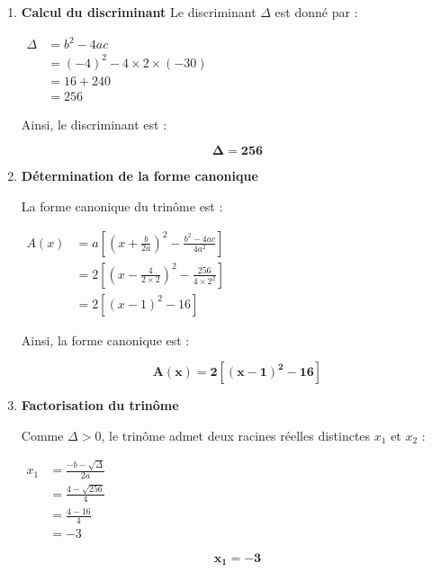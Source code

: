\documentclass[a4paper,12pt]{article}
\begin{document}
\begin{enumerate}
    \item \textbf{Calcul du discriminant}  
    Le discriminant \(\Delta\) est donné par :
    
$
\begin{aligned}
 \Delta &= b^2 - 4ac\\ 
 &= (-4)^2 - 4 \times 2 \times (-30) \\
 &= 16 + 240\\
 &= 256
\end{aligned}
$

Ainsi, le discriminant est : 

\begin{resultbox}
    \[
    \mathbf{\Delta = 256}
    \]
\end{resultbox}

    \item \textbf{Détermination de la forme canonique}  
    
    La forme canonique du trinôme est :

$
\begin{aligned}
    A(x)&= a \left[ \left(x + \frac{b}{2a}\right)^2 - \frac{b^{2}-4ac}{4a^{2}}\right]\\
        &=  2 \left[ \left(x - \frac{4}{2 \times 2 }\right)^2 - \frac{256}{4 \times 2^2}\right]\\
        &=2 \left[\left( x - 1 \right)^2 - 16\right]
\end{aligned}
$

Ainsi, la forme canonique est :

\begin{resultbox}
    \[
    \mathbf{A(x) = 2 \left[\left( x - 1 \right)^2 - 16\right]}
    \]
\end{resultbox}

    \item \textbf{Factorisation du trinôme}  
    
    Comme \(\Delta > 0\), le trinôme admet deux racines réelles distinctes \( x_1 \) et \( x_2 \) :
    
$
\begin{aligned}
        x_1 &= \frac{-b - \sqrt{\Delta}}{2a}\\
        &= \frac{4 - \sqrt{256}}{4}\\
        &= \frac{4 - 16}{4}\\
        &= -3
\end{aligned}
$

\begin{resultbox}
    \[
    \mathbf{x_1 = -3}
    \]
\end{resultbox}


\end{enumerate}
\end{document}
